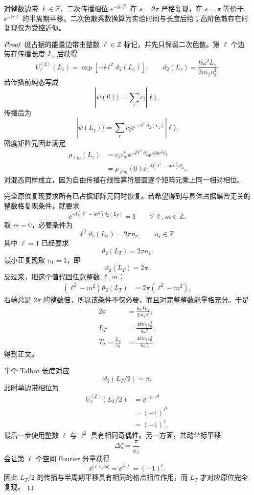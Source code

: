 \begin{proposition}[整数能量梳的二次相位复现]
对整数边带 $\ell\in\mathbb Z$，二次传播相位 $e^{-\ii s\ell^2}$ 在 $s=2\pi$ 严格复现，在 $s=\pi$ 等价于 $e^{-\ii\pi\ell}$ 的半周期平移。二次色散系数换算为实验时间与长度后给；高阶色散存在时复现仅为受控近似。
\end{proposition}
\begin{proof}
设占据的能量边带由整数 $\ell\in\mathbb Z$ 标记，并先只保留二次色散。第 $\ell$ 个边带在传播长度 $L_z$ 后获得
\[
U_\ell^{(2)}(L_z)
=\exp[-\ii\ell^2\vartheta_2(L_z)],
\qquad
\vartheta_2(L_z)=\frac{\hbar\omega^2L_z}{2m_\parallel v_0^3}.
\]
若传播前纯态写成
\[
|\psi(0)\rangle=\sum_\ell c_\ell|\ell\rangle,
\]
传播后为
\[
|\psi(L_z)\rangle
=\sum_\ell c_\ell
\ee^{-\ii\ell^2\vartheta_2(L_z)}|\ell\rangle.
\]
密度矩阵元因此满足
\begin{align*}
\rho_{\ell m}(L_z)
&=c_\ell c_m^*
\ee^{-\ii\ell^2\vartheta_2}
\ee^{+\ii m^2\vartheta_2}\\
&=\rho_{\ell m}(0)
\ee^{-\ii(\ell^2-m^2)\vartheta_2}.
\end{align*}
对混态同样成立，因为自由传播在线性算符层面逐个矩阵元乘上同一相对相位。

完全原位复现要求所有已占据矩阵元同时恢复。若希望得到与具体占据集合无关的整数格复现条件，就要求
\[
\ee^{-\ii(\ell^2-m^2)\vartheta_2(L_T)}=1
\qquad
\forall\,\ell,m\in\mathbb Z.
\]
取 $m=0$，必要条件为
\[
\ell^2\vartheta_2(L_T)=2\pi n_\ell,
\qquad n_\ell\in\mathbb Z.
\]
其中 $\ell=1$ 已经要求
\[
\vartheta_2(L_T)=2\pi n_1.
\]
最小正复现取 $n_1=1$，即
\[
\vartheta_2(L_T)=2\pi.
\]
反过来，把这个值代回任意整数 $\ell,m$：
\begin{align*}
(\ell^2-m^2)\vartheta_2(L_T)
&=2\pi(\ell^2-m^2),
\end{align*}
右端总是 $2\pi$ 的整数倍，所以该条件不仅必要，而且对完整整数能量格充分。于是
\begin{align*}
2\pi
&=\frac{\hbar\omega^2L_T}{2m_\parallel v_0^3},\\
L_T
&=\frac{4\pi m_\parallel v_0^3}{\hbar\omega^2},\\
T_T=\frac{L_T}{v_0}
&=\frac{4\pi m_\parallel v_0^2}{\hbar\omega^2},
\end{align*}
得到正文。

半个 Talbot 长度对应
\[
\vartheta_2(L_T/2)=\pi.
\]
此时单边带相位为
\begin{align*}
U_\ell^{(2)}(L_T/2)
&=\ee^{-\ii\pi\ell^2}\\
&=(-1)^{\ell^2}\\
&=(-1)^\ell,
\end{align*}
最后一步使用整数 $\ell$ 与 $\ell^2$ 具有相同奇偶性。另一方面，共动坐标平移
\[
\Delta\zeta=\frac{\pi}{\kappa_z}
\]
会让第 $\ell$ 个空间 Fourier 分量获得
\[
\ee^{\ii\ell\kappa_z\Delta\zeta}
=\ee^{\ii\pi\ell}=(-1)^\ell.
\]
因此 $L_T/2$ 的传播与半周期平移具有相同的格点相位作用，而 $L_T$ 才对应原位完全复现。
\end{proof}


